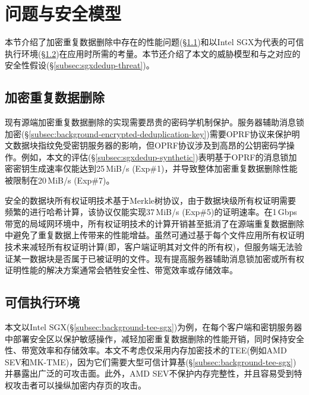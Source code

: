 \section{问题与安全模型}
\label{sec:sgxdedup-background}

本节介绍了加密重复数据删除中存在的性能问题(\S\ref{subsec:sgxdedup-problem})和以Intel SGX为代表的可信执行环境(\S\ref{subsec:sgxdedup-sgx})在应用时所需的考量。本节还介绍了本文的威胁模型和与之对应的安全性假设(\S\ref{subsec:sgxdedup-threat})。

\subsection{加密重复数据删除}
\label{subsec:sgxdedup-problem}

现有源端加密重复数据删除的实现需要昂贵的密码学机制保护。服务器辅助消息锁加密(\S\ref{subsec:background-encrypted-deduplication-key})需要OPRF协议来保护明文数据块指纹免受密钥服务器的影响，但OPRF协议涉及到高昂的公钥密码学操作。例如，本文的评估(\S\ref{subsec:sgxdedup-synthetic})表明基于OPRF的消息锁加密密钥生成速率仅能达到25\,MiB/s (Exp\#1)，并导致整体加密重复数据删除性能被限制在20\,MiB/s (Exp\#7)。

安全的数据块所有权证明技术基于Merkle树协议，由于数据块级所有权证明需要频繁的进行哈希计算，该协议仅能实现37\,MiB/s (Exp\#5)的证明速率。在1\,Gbps带宽的局域网环境中，所有权证明技术的计算开销甚至抵消了在源端重复数据删除中避免了重复数据上传带来的性能增益。虽然可通过基于每个文件应用所有权证明技术来减轻所有权证明计算(即，客户端证明其对文件的所有权)，但服务端无法验证某一数据块是否属于已被证明的文件。现有提高服务器辅助消息锁加密或所有权证明性能的解决方案通常会牺牲安全性、带宽效率或存储效率。


\subsection{可信执行环境}
\label{subsec:sgxdedup-sgx}

本文以Intel SGX(\S\ref{subsec:background-tee-sgx})为例，在每个客户端和密钥服务器中部署安全区以保护敏感操作，减轻加密重复数据删除的性能开销，同时保持安全性、带宽效率和存储效率。本文不考虑仅采用内存加密技术的TEE(例如AMD SEV和MK-TME)，因为它们需要大型可信计算基(\S\ref{subsec:background-tee-sgx})并暴露出广泛的可攻击面。此外，AMD SEV不保护内存完整性，并且容易受到特权攻击者可以操纵加密内存页的攻击。


